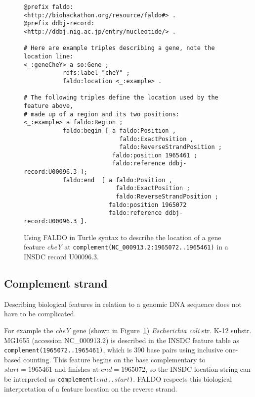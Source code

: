 %
\begin{figure}
\begin{shaded}
\small
\begin{verbatim} 
@prefix faldo:       <http://biohackathon.org/resource/faldo#> .
@prefix ddbj-record: <http://ddbj.nig.ac.jp/entry/nucleotide/> . 

# Here are example triples describing a gene, note the location line:
<_:geneCheY> a so:Gene ;
           rdfs:label "cheY" ;
           faldo:location <_:example> .

# The following triples define the location used by the feature above,
# made up of a region and its two positions:
<_:example> a faldo:Region ;
           faldo:begin [ a faldo:Position ,
                           faldo:ExactPosition ,
                           faldo:ReverseStrandPosition ;
                         faldo:position 1965461 ;
                         faldo:reference ddbj-record:U00096.3 ];
           faldo:end  [ a faldo:Position ,
                          faldo:ExactPosition ;
                          faldo:ReverseStrandPosition ;
                        faldo:position 1965072
                        faldo:reference ddbj-record:U00096.3 ].
\end{verbatim}
\end{shaded}
\caption{Using FALDO in Turtle\cite{TurtleFormatSpec} syntax to describe the location of a
gene feature \textit{cheY} at \texttt{complement(NC\_000913.2:1965072..1965461)} in a INSDC record U00096.3.}
\label{fig:insdcComplement}
\end{figure}


\subsection*{Complement strand}

Describing biological features in relation to a genomic DNA sequence does not have to be complicated.

For example the \textit{cheY} gene (shown in Figure~\ref{fig:insdcComplement})
\textit{Escherichia coli} str. K-12 substr. MG1655 (accession NC\_000913.2)
is described in the INSDC feature table as \texttt{complement(1965072..1965461)},
which is 390 base pairs using inclusive one-based counting.
This feature begins on the base complementary to $start = 1965461$
and finishes at $end = 1965072$, so the INSDC location string
can be interpreted as \texttt{complement($end$..$start$)}.
FALDO respects this biological interpretation of a feature location
on the reverse strand.

